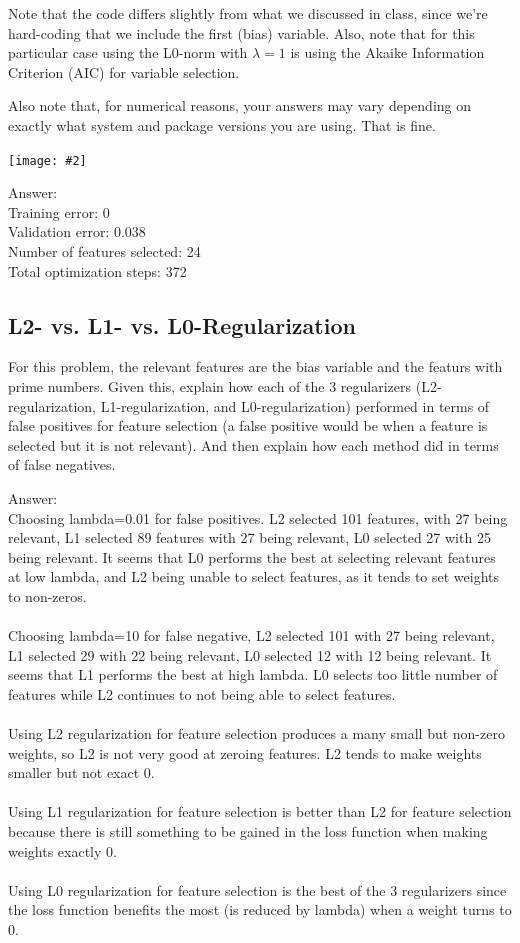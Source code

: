 \documentclass{article}
\def\ans#1{\par\gre{Answer: #1}}
\def\blu#1{{\color{blu}#1}}
\def\gre#1{{\color{gre}#1}}
\newcommand{\centerfig}[2]{\begin{center}\texttt{[image: \#2]}\end{center}}
\begin{document}
Note that the code differs slightly from what we discussed in class,
since we're hard-coding that we include the first (bias) variable.
Also, note that for this particular case using the L0-norm with $\lambda=1$
is using the Akaike Information Criterion (AIC) for variable selection.

Also note that, for numerical reasons, your answers may vary depending on exactly what system and package versions you are using. That is fine.

\centerfig{0.8}{q2.3-code}
\ans{\\
Training error: 0\\
Validation error: 0.038 \\
Number of features selected: 24 \\
Total optimization steps: 372\\
}

\pagebreak

\subsection{L2- vs. L1- vs. L0-Regularization}

For this problem, the relevant features are the bias variable and the featurs with prime numbers. Given this, \blu{explain how each of the 3 regularizers (L2-regularization, L1-regularization, and L0-regularization) performed in terms of false positives for feature selection (a false positive would be when a feature is selected but it is not relevant). And then explain how each method did in terms of false negatives.}

\ans{\\
    Choosing lambda=0.01 for false positives. L2 selected 101 features, with 27 being relevant, L1 selected 89 features with 27 being relevant, L0 selected 27 with 25 being relevant. It seems that L0 performs the best at selecting relevant features at low lambda, and L2 being unable to select features, as it tends to set weights to non-zeros.
\\\\
    Choosing lambda=10 for false negative, L2 selected 101 with 27 being relevant, L1 selected 29 with 22 being relevant, L0 selected 12 with 12 being relevant. It seems that L1 performs the best at high lambda. L0 selects too little number of features while L2 continues to not being able to select features.
\\\\
    Using L2 regularization for feature selection produces a many small but non-zero weights, so L2 is not very good at zeroing features. L2 tends to make weights smaller but not exact 0.
    \\\\
    Using L1 regularization for feature selection is better than L2 for feature selection because there is still something to be gained in the loss function when making weights exactly 0.
    \\\\
    Using L0 regularization for feature selection is the best of the 3 regularizers since the loss function benefits the most (is reduced by lambda) when a weight turns to 0.
}
\end{document}
